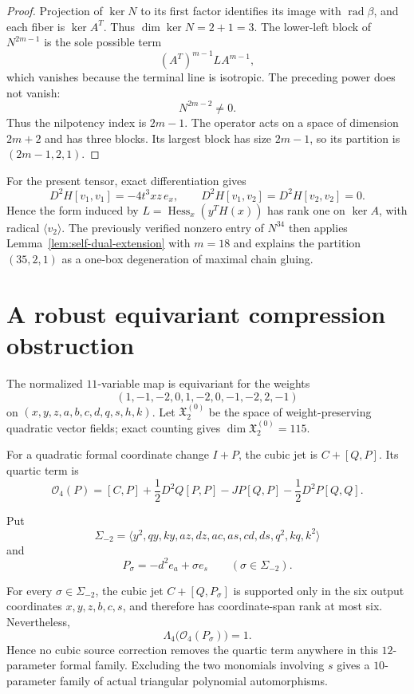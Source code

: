\begin{proof}
Projection of $\ker N$ to its first factor identifies its image with
$\operatorname{rad}\beta$, and each fiber is $\ker A^T$.  Thus
$\dim\ker N=2+1=3$.  The lower-left block of $N^{2m-1}$ is the sole possible
term
\[
(A^T)^{m-1}LA^{m-1},
\]
which vanishes because the terminal line is isotropic.  The preceding power
does not vanish:
\[
N^{2m-2}\ne0.
\]
Thus the nilpotency index is \(2m-1\).  The operator acts on a space of
dimension \(2m+2\) and has three blocks.  Its largest block has size
\(2m-1\), so its partition is \((2m-1,2,1)\).
\end{proof}

For the present tensor, exact differentiation gives
\[
D^2H[v_1,v_1]=-4t^3xz\,e_x,
\qquad
D^2H[v_1,v_2]=D^2H[v_2,v_2]=0.
\]
Hence the form induced by
$L=\operatorname{Hess}_x(y^TH(x))$ has rank one on $\ker A$, with radical
$\langle v_2\rangle$.  The previously verified nonzero entry of $N^{34}$
then applies Lemma~\ref{lem:self-dual-extension} with $m=18$ and explains the
partition $(35,2,1)$ as a one-box degeneration of maximal chain gluing.

\section{A robust equivariant compression obstruction}
\label{sec:robust-compression}

The normalized $11$-variable map is equivariant for the weights
\[
(1,-1,-2,0,1,-2,0,-1,-2,2,-1)
\]
on $(x,y,z,a,b,c,d,q,s,h,k)$.  Let $\mathfrak X_2^{(0)}$ be the space of
weight-preserving quadratic vector fields; exact counting gives
$\dim\mathfrak X_2^{(0)}=115$.

For a quadratic formal coordinate change $I+P$, the cubic jet is
$C+[Q,P]$.  Its quartic term is
\begin{equation}
\label{eq:quartic-obstruction-general}
\mathcal O_4(P)
 =[C,P]+\frac12D^2Q[P,P]-JP[Q,P]-\frac12D^2P[Q,Q].
\end{equation}

Put
\[
\Sigma_{-2}=\langle
 y^2,qy,ky,az,dz,ac,as,cd,ds,q^2,kq,k^2
\rangle
\]
and
\[
P_\sigma=-d^2e_a+\sigma e_s\qquad(\sigma\in\Sigma_{-2}).
\]

\begin{proposition}
\label{prop:compression-family}
For every $\sigma\in\Sigma_{-2}$, the cubic jet
$C+[Q,P_\sigma]$ is supported only in the six output coordinates
$x,y,z,b,c,s$, and therefore has coordinate-span rank at most six.  Nevertheless,
\[
\Lambda_4\bigl(\mathcal O_4(P_\sigma)\bigr)=1.
\]
Hence no cubic source correction removes the quartic term anywhere in this
$12$-parameter formal family.  Excluding the two monomials involving $s$
gives a $10$-parameter family of actual triangular polynomial automorphisms.
\end{proposition}

